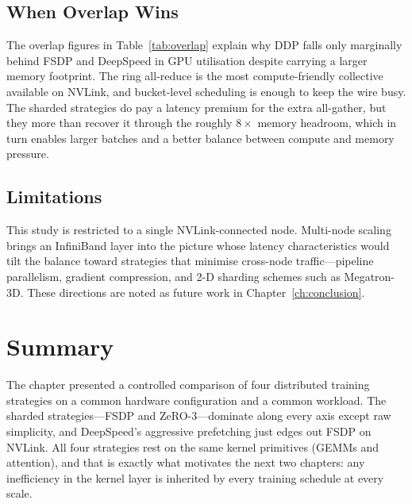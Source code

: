 \subsection{When Overlap Wins}\label{sec:dist_overlap_wins}
The overlap figures in Table~\ref{tab:overlap} explain why DDP
falls only marginally behind FSDP and DeepSpeed in GPU utilisation
despite carrying a larger memory footprint. The ring all-reduce is
the most compute-friendly collective available on NVLink, and
bucket-level scheduling is enough to keep the wire busy. The
sharded strategies do pay a latency premium for the extra
all-gather, but they more than recover it through the roughly
$8\times$ memory headroom, which in turn enables larger batches and
a better balance between compute and memory pressure.

\subsection{Limitations}\label{sec:dist_limitations}
This study is restricted to a single NVLink-connected node.
Multi-node scaling brings an InfiniBand layer into the picture
whose latency characteristics would tilt the balance toward
strategies that minimise cross-node traffic---pipeline parallelism,
gradient compression, and 2-D sharding schemes such as Megatron-3D.
These directions are noted as future work in
Chapter~\ref{ch:conclusion}.

\section{Summary}\label{sec:dist_summary}
The chapter presented a controlled comparison of four distributed
training strategies on a common hardware configuration and a common
workload. The sharded strategies---FSDP and ZeRO-3---dominate along
every axis except raw simplicity, and DeepSpeed's aggressive
prefetching just edges out FSDP on NVLink. All four strategies rest
on the same kernel primitives (GEMMs and attention), and that is
exactly what motivates the next two chapters: any inefficiency in
the kernel layer is inherited by every training schedule at every
scale.
